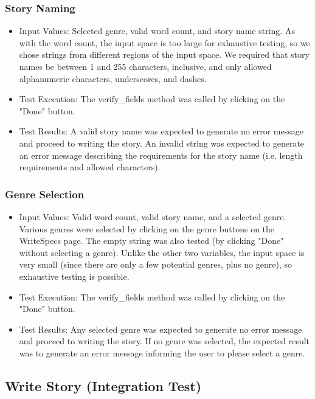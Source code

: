 \documentclass[12pt]{article}
\begin{document}
\subsubsection{Story Naming}

\begin{itemize}
\item Input Values: Selected genre, valid word count, and story name string. As with the word count, the input space is too large for exhaustive testing, so we chose strings from different regions of the input space. We required that story names be between 1 and 255 characters, inclusive, and only allowed alphanumeric characters, underscores, and dashes.
\item Test Execution: The verify\_fields method was called by clicking on the "Done" button.
\item Test Results: A valid story name was expected to generate no error message and proceed to writing the story. An invalid string was expected to generate an error message describing the requirements for the story name (i.e. length requirements and allowed characters).
\end{itemize}

\subsubsection{Genre Selection}

\begin{itemize}
\item Input Values: Valid word count, valid story name, and a selected genre. Various genres were selected by clicking on the genre buttons on the WriteSpecs page. The empty string was also tested (by clicking "Done" without selecting a genre). Unlike the other two variables, the input space is very small (since there are only a few potential genres, plus no genre), so exhaustive testing is possible.
\item Test Execution: The verify\_fields method was called by clicking on the "Done" button.
\item Test Results: Any selected genre was expected to generate no error message and proceed to writing the story. If no genre was selected, the expected result was to generate an error message informing the user to please select a genre.
\end{itemize}

\subsection{Write Story (Integration Test)}
\end{document}
